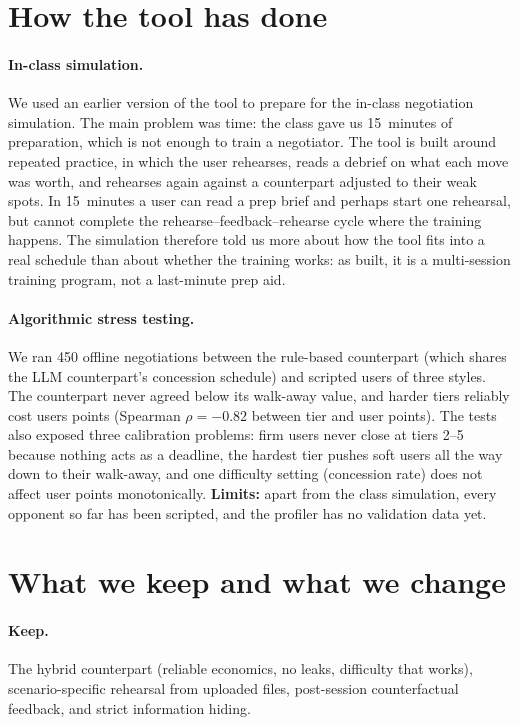 \documentclass[10pt]{article}
\begin{document}
\section{How the tool has done}

\paragraph{In-class simulation.} We used an earlier version of the tool to prepare for the
in-class negotiation simulation. The main problem was time: the class gave us
15~minutes of preparation, which is not enough to train a negotiator. The tool is built
around repeated practice, in which the user rehearses, reads a debrief on what each move
was worth, and rehearses again against a counterpart adjusted to their weak spots. In
15~minutes a user can read a prep brief and perhaps start one rehearsal, but cannot
complete the rehearse--feedback--rehearse cycle where the training happens. The
simulation therefore told us more about how the tool fits into a real schedule than about
whether the training works: as built, it is a multi-session training program, not a
last-minute prep aid.

\paragraph{Algorithmic stress testing.} We ran 450 offline negotiations between the
rule-based counterpart (which shares the LLM counterpart's concession schedule) and
scripted users of three styles. The counterpart never agreed below its walk-away value,
and harder tiers reliably cost users points (Spearman $\rho = -0.82$ between tier and user
points). The tests also exposed three calibration problems: firm users never close at
tiers 2--5 because nothing acts as a deadline, the hardest tier pushes soft users all the
way down to their walk-away, and one difficulty setting (concession rate) does not affect
user points monotonically. \textbf{Limits:} apart from the class simulation, every
opponent so far has been scripted, and the profiler has no validation data yet.

\section{What we keep and what we change}
\label{sec:change}

\paragraph{Keep.} The hybrid counterpart (reliable economics, no leaks, difficulty that
works), scenario-specific rehearsal from uploaded files, post-session counterfactual
feedback, and strict information hiding.
\end{document}
